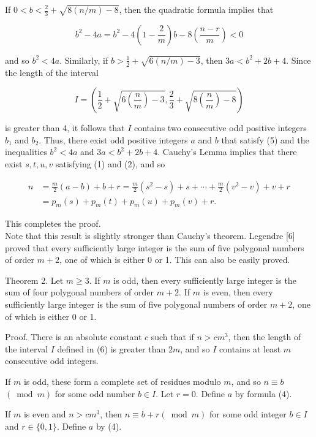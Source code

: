 \documentclass[10pt]{article}
\begin{document}
If $0<b<\frac{2}{3}+\sqrt{8(n / m)-8}$, then the quadratic formula implies that

$$
b^{2}-4 a=b^{2}-4\left(1-\frac{2}{m}\right) b-8\left(\frac{n-r}{m}\right)<0
$$

and so $b^{2}<4 a$. Similarly, if $b>\frac{1}{2}+\sqrt{6(n / m)-3}$, then $3 a<b^{2}+2 b+4$. Since the length of the interval


\begin{equation*}
I=\left(\frac{1}{2}+\sqrt{6\left(\frac{n}{m}\right)-3}, \frac{2}{3}+\sqrt{8\left(\frac{n}{m}\right)-8}\right) \tag{6}
\end{equation*}


is greater than 4, it follows that $I$ contains two consecutive odd positive integers $b_{1}$ and $b_{2}$. Thus, there exist odd positive integers $a$ and $b$ that satisfy (5) and the inequalities $b^{2}<4 a$ and $3 a<b^{2}+2 b+4$. Cauchy's Lemma implies that there exist $s, t, u, v$ satisfying (1) and (2), and so

$$
\begin{aligned}
n & =\frac{m}{2}(a-b)+b+r=\frac{m}{2}\left(s^{2}-s\right)+s+\cdots+\frac{m}{2}\left(v^{2}-v\right)+v+r \\
& =p_{m}(s)+p_{m}(t)+p_{m}(u)+p_{m}(v)+r .
\end{aligned}
$$

This completes the proof.\\[0pt]
Note that this result is slightly stronger than Cauchy's theorem. Legendre [6] proved that every sufficiently large integer is the sum of five polygonal numbers of order $m+2$, one of which is either 0 or 1. This can also be easily proved.

Theorem 2. Let $m \geqslant 3$. If $m$ is odd, then every sufficiently large integer is the sum of four polygonal numbers of order $m+2$. If $m$ is even, then every sufficiently large integer is the sum of five polygonal numbers of order $m+2$, one of which is either 0 or 1.

Proof. There is an absolute constant $c$ such that if $n>c m^{3}$, then the length of the interval $I$ defined in (6) is greater than $2 m$, and so $I$ contains at least $m$ consecutive odd integers.

If $m$ is odd, these form a complete set of residues modulo $m$, and so $n \equiv b$ $(\bmod m)$ for some odd number $b \in I$. Let $r=0$. Define $a$ by formula (4).

If $m$ is even and $n>c m^{3}$, then $n \equiv b+r(\bmod m)$ for some odd integer $b \in I$ and $r \in\{0,1\}$. Define $a$ by (4).
\end{document}
